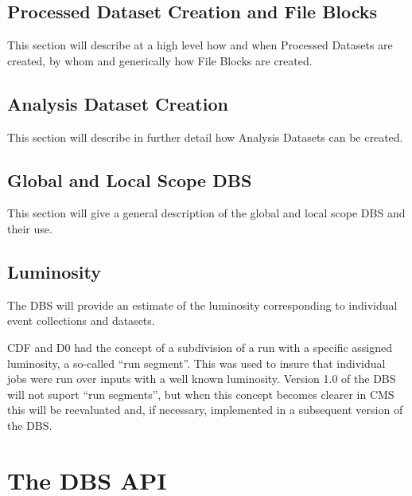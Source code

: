 \documentclass[pdftex]{cmspaper}
\begin{document}

\subsection{Processed Dataset Creation and File Blocks}
\label{sec:ProcDcreation}

  This section will describe at a high level how and when Processed Datasets
are created, by whom and generically how File Blocks are created.

\subsection{Analysis Dataset Creation}
\label{sec:ADcreation}

  This section will describe in further detail how Analysis Datasets can
be created.

\subsection{Global and Local Scope DBS}
\label{sec:DBSscopes}
  This section will give a general description of the global and local scope
DBS and their use.

\subsection{Luminosity}
\label{sec:Luminosity}

  The DBS will provide an estimate of the luminosity corresponding to 
individual event collections and datasets.

  CDF and D0 had the concept of a subdivision of a run with a specific 
assigned luminosity, a so-called ``run segment''. This was used to insure
that individual jobs were run over inputs with a well known luminosity. 
Version 1.0 of the DBS will not suport ``run segments'', but when this
concept becomes clearer in CMS this will be reevaluated and, if necessary, 
implemented in a subsequent version of the DBS.

\section{The DBS API}
\end{document}
